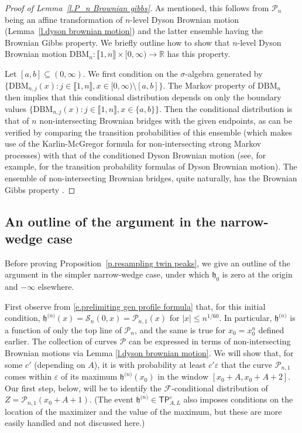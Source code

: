 \documentclass[oneside,final,11pt]{amsart}
\theoremstyle{definition}
\newcounter{assum}
\renewcommand{\L}{\CP}
\newcommand{\fh}{\mathfrak{h}}
\newcommand{\h}{\fh^{{\scriptscriptstyle(}n{\scriptscriptstyle)}}}
\newcommand{\TP}[1]{\mathsf{TP}_{\!\!#1}}
\newcommand{\intint}[1]{\llbracket1,#1\rrbracket}
\newcommand{\R}{\mathbb{R}}
\newcommand{\CS}{\mathcal{S}}
\renewcommand{\S}{\CS}
\newcommand{\1}[1]{\mathbf{1}_{#1}}
\newcommand{\eps}{\varepsilon}
\newcommand{\F}{\mathscr{F}}
\newcommand{\smallconst}{c'}
\newcommand{\red}[1]{{\color{red}#1}}
\newcommand{\CP}{\mathcal{P}}
\numberwithin{equation}{section}
\begin{document}
\begin{proof}[Proof of Lemma~\ref{l.P_n Brownian gibbs}]
As mentioned, this follows from $\L_n$ being an affine transformation of $n$-level Dyson Brownian motion (Lemma~\ref{l.dyson brownian motion}) and the latter ensemble having the Brownian Gibbs property. We briefly outline how to show that $n$-level Dyson Brownian motion $\mathrm{DBM}_n : \intint{n}\times[0,\infty)\to\R$ has this property.

Let $[a,b] \subseteq (0,\infty)$. We first condition on the $\sigma$-algebra generated by $\{\mathrm{DBM}_{n,j}(x) : j\in\llbracket 1,n\rrbracket, x \in [0, \infty)\setminus [a,b]\}$. The Markov property of $\mathrm{DBM}_n$ then implies that this conditional distribution depends on only the boundary values $\{\mathrm{DBM}_{n,j}(x) : j\in\intint{n}, x\in\{a,b\}\}$. Then the conditional distribution is that of $n$ non-intersecting Brownian bridges with the given endpoints, as can be verified by comparing the transition probabilities of this ensemble (which makes use of the Karlin-McGregor formula \cite{karlinMcGregor} for non-intersecting strong Markov processes) with that of the conditioned Dyson Brownian motion (see, for example, \cite[Section~3]{warren2007dyson} for the transition probability formulas of Dyson Brownian motion). The ensemble of non-intersecting Brownian bridges, quite naturally, has the Brownian Gibbs property \cite[Lemma 2.13]{dimitrov2020characterization}.
 \end{proof}

\subsection{An outline of the argument in the narrow-wedge case}\label{sec:nwoutline}
Before proving Proposition~\ref{p.resampling twin peaks}, we give an outline of the argument in the simpler narrow-wedge case, under which $\fh_0$ is zero at the origin and $-\infty$ elsewhere.

First observe from \eqref{e.prelimiting gen profile formula} that, for this initial condition, $\h(x) = \S_n(0,x) = \L_{n,1}(x)$ for $|x|\leq n^{1/60}$. In particular, $\h$ is a function of only the top line of $\L_n$, and the same is true for $x_0=x_0^{n}$ defined earlier. The collection of curves $\L$ can be expressed in terms of non-intersecting Brownian motions via Lemma \ref{l.dyson brownian motion}. We will show that, for some $\smallconst$ (depending on $A$), it is with probability at least $\smallconst \eps$ that the curve $\L_{n,1}$ comes within $\eps$ of its maximum $\h(x_0)$ in the window $[x_0+A,x_0+A+2]$. Our first step, below, will be to identify the $\F$-conditional distribution of $Z=\L_{n,1}(x_0+A+1)$. (The event $\h\in\TP{A,L}^\eps$ also imposes conditions on the location of the maximizer and the value of the maximum, but these are more easily handled and not discussed here.)
\end{document}
